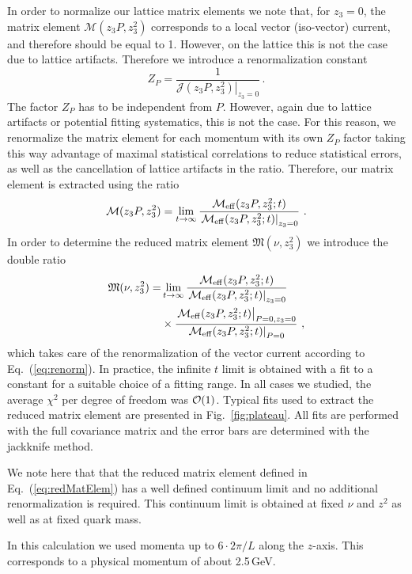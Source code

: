 In order to normalize our lattice matrix elements we note that, for $z_3=0$, the matrix element
 $\mathcal{M}(z_3 P, z_3^2)$  corresponds to a  local vector (iso-vector) current, and therefore should  be equal to 1. However, on the lattice this is not the case due to lattice artifacts.
 Therefore we introduce a renormalization constant
 \begin{equation}
 Z_P = \frac{1}{ \left.\mathcal{J}(z_3 P, z_3^2)\right|_{z_3=0}}\, .
 \label{eq:renorm}
 \end{equation}
 The factor  $Z_P$ has to be independent from $P$.  However,  again due to lattice
  artifacts or potential fitting systematics,  this is not the case. For this reason,
   we renormalize  the matrix element for
   each momentum  with its own $Z_P$ factor taking this way advantage of maximal statistical correlations {to reduce statistical errors},  as well as the cancellation of lattice artifacts in the ratio.
  Therefore,  our  matrix element is extracted  using the ratio
  \begin{equation}
\mathcal{M}(z_3 P, z_3^2)= \lim_{t\rightarrow\infty}  \frac{\mathcal{M}_{\rm eff}(z_3 P, z_3^2;t)}{\left.\mathcal{M}_{\rm eff}(z_3 P, z_3^2;t)\right|_{z_3=0}}  \  .
 \end{equation}
 In order to determine the reduced matrix element $\mathfrak{M}(\nu,z_3^2)$ we introduce the double ratio
 \begin{align}
\mathfrak{M}(\nu, z_3^2)=&  \lim_{t\rightarrow\infty}
 \frac{\mathcal{M}_{\rm eff}(z_3 P, z_3^2;t)}{\left.\mathcal{M}_{\rm eff}(z_3 P, z_3^2;t)\right|_{z_3=0}} \nonumber \\
 &\times
\frac{\left.\mathcal{M}_{\rm eff}(z_3  P, z_3^2;t)\right|_{P=0,z_3=0}}
{\left.\mathcal{M}_{\rm eff}(z_3  P, z_3^2;t)\right|_{P=0}}  \ ,
\label{eq:redMatElem}
 \end{align}
 which takes care of the renormalization of the vector current according to Eq.~(\ref{eq:renorm}).
 In practice, the   infinite $t$ limit is obtained with a fit to a constant  for  a suitable choice of a fitting range. In all cases we studied,  the average $\chi^2$ per degree of freedom was ${\cal O}(1)$. Typical fits used to extract the reduced matrix element are presented in Fig.~\ref{fig:plateau}. All fits are performed with the full covariance matrix and the error bars are determined with  the jackknife method.

 We note here that that the reduced  matrix element defined in Eq.~(\ref{eq:redMatElem}) has a well defined continuum limit and no additional renormalization is required. This continuum limit is obtained at fixed $\nu$ and $z^2$ as well as at fixed quark mass.


In this calculation we used momenta up to $6\cdot 2\pi/L $ along the $z$-axis. This corresponds to a physical momentum of about 2.5\,GeV.
